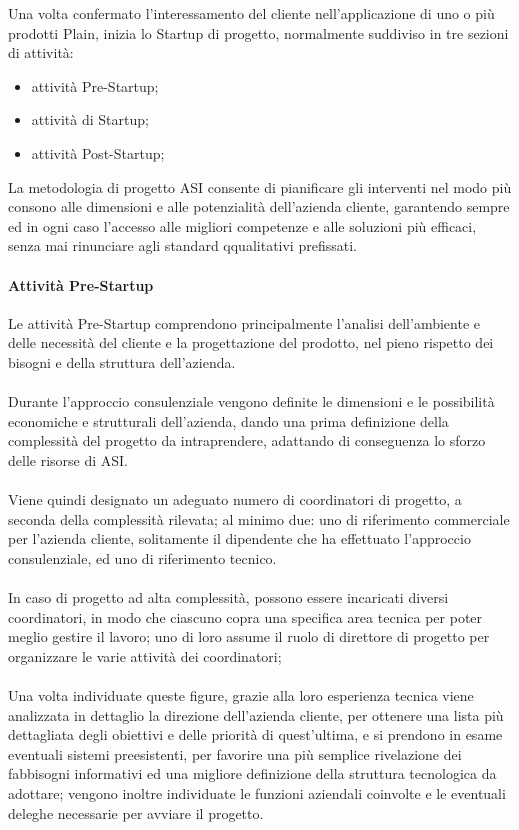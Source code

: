 Una volta confermato l'interessamento del cliente nell'applicazione di uno o più prodotti Plain, inizia lo Startup di progetto, normalmente suddiviso in tre sezioni di attività:
\begin{itemize}
	\item attività Pre-Startup;
	\item attività di Startup;
	\item attività Post-Startup;
\end{itemize}
La metodologia di progetto ASI consente di pianificare gli interventi nel modo più consono alle dimensioni e alle potenzialità dell'azienda cliente, garantendo sempre ed in ogni caso l'accesso alle migliori competenze e alle soluzioni più efficaci, senza mai rinunciare agli standard qqualitativi prefissati.
\paragraph{Attività Pre-Startup}
Le attività Pre-Startup comprendono principalmente l'analisi dell'ambiente e delle necessità del cliente e la progettazione del prodotto, nel pieno rispetto dei bisogni e della struttura dell'azienda.
\\\\
Durante l'approccio consulenziale vengono definite le dimensioni e le possibilità economiche e strutturali dell'azienda, dando una prima definizione della complessità del progetto da intraprendere, adattando di conseguenza lo sforzo delle risorse di ASI.
\\\\
Viene quindi designato un adeguato numero di coordinatori di progetto, a seconda della complessità rilevata; al minimo due: uno di riferimento commerciale per l'azienda cliente, solitamente il dipendente che ha effettuato l'approccio consulenziale, ed uno di riferimento tecnico.
\\\\
In caso di progetto ad alta complessità, possono essere incaricati diversi coordinatori, in modo che ciascuno copra una specifica area tecnica per poter meglio gestire il lavoro; uno di loro assume il ruolo di direttore di progetto per organizzare le varie attività dei coordinatori;
\\\\
Una volta individuate queste figure, grazie alla loro esperienza tecnica viene analizzata in dettaglio la direzione dell'azienda cliente, per ottenere una lista più dettagliata degli obiettivi e delle priorità di quest'ultima, e si prendono in esame eventuali sistemi preesistenti, per favorire una più semplice rivelazione dei fabbisogni informativi ed una migliore definizione della struttura tecnologica da adottare; vengono inoltre individuate le funzioni aziendali coinvolte e le eventuali deleghe necessarie per avviare il progetto.

